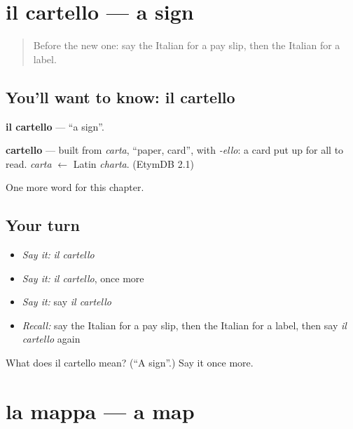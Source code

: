 \section[il cartello]{il cartello — a sign}

\label{lesson:IT-C198-cartello}



\begin{quote}
Before the new one: say the Italian for a pay slip, then the Italian for a label.
\end{quote}

\subsection*{You'll want to know: il cartello}
\textbf{il cartello} — \textquotedblleft{}a sign\textquotedblright{}.

\begin{cousinweb}
\textbf{cartello} — built from \emph{carta}, \textquotedblleft{}paper, card\textquotedblright{}, with \emph{-ello}: a card put up for all to read. \emph{carta} $\leftarrow$ Latin \emph{charta}. (EtymDB 2.1)
\end{cousinweb}

\begin{grammarlens}[title={What you've built}]
One more word for this chapter.
\end{grammarlens}

\subsection*{Your turn}
\begin{itemize}
\raggedright
  \item \emph{Say it:} \emph{il cartello}
  \item \emph{Say it:} \emph{il cartello}, once more
  \item \emph{Say it:} say \emph{il cartello}
  \item \emph{Recall:} say the Italian for a pay slip, then the Italian for a label, then say \emph{il cartello} again
\end{itemize}

\begin{tcolorbox}[breakable,colback=teal!4,colframe=teal!35!black,title={Before you move on}]
What does il cartello mean? (\textquotedblleft{}A sign\textquotedblright{}.) Say it once more.
\end{tcolorbox}
\section[la mappa]{la mappa — a map}

